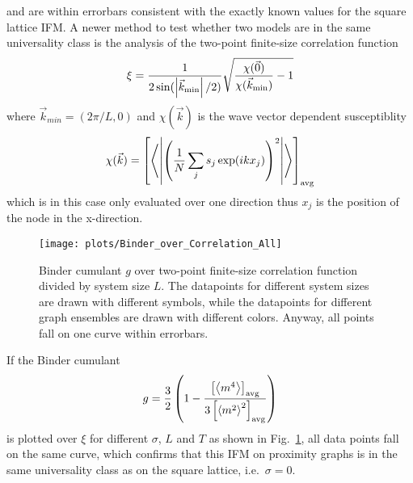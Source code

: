 and are within errorbars consistent with the exactly known values for the
square lattice IFM.
A newer method \cite{chiCollapse,Hartmann2013} to test whether two models are in
the same universality class is the analysis of the two-point finite-size
correlation function
\[\xi = \frac{1}{2\sin(\left\vert\vec{k}_{\mathrm{min}}\right\vert/2)} \sqrt{\frac{\chi(\vec{0})}{\chi(\vec{k}_{\mathrm{min}})} - 1}\]
where $\vec{k}_{min}=(2\pi / L, 0)$ and $\chi(\vec{k})$ is the wave vector
dependent susceptiblity
\[\chi(\vec{k}) = \left[ \left< \left\vert\left(\frac{1}{N}\sum_j s_j \exp(ikx_j)\right)^2\right\vert \right> \right] _{\mathrm{avg}}\]
which is in this case only evaluated over one direction thus $x_j$ is the
position of the node in the x-direction.

\begin{figure}[htbp]
    \centering
    \texttt{[image: plots/Binder\_over\_Correlation\_All]}
    \caption[Binder cumulant over two-point finite-size correlation function divided by system size]
    {
        Binder cumulant $g$ over two-point finite-size correlation function
        divided by system size $L$. The datapoints for different system sizes
        are drawn with different symbols, while the datapoints for different
        graph ensembles are drawn with different colors. Anyway, all points
        fall on one curve within errorbars.
    }
    \label{fig:binderOverCorr}
\end{figure}
If the Binder cumulant
\[g = \frac{3}{2}\left(1-\frac{\left[ \left< m^4 \right> \right] _{\mathrm{avg}}}{3\left[ \left< m^2 \right>^2 \right] _{\mathrm{avg}}}\right)\]
is plotted over $\xi$ for different $\sigma$, $L$ and $T$ as shown in
Fig.~\ref{fig:binderOverCorr}, all data points fall on the
same curve, which confirms that this IFM on proximity graphs is in the
same universality class as on the square lattice, i.e.~$\sigma=0$.


